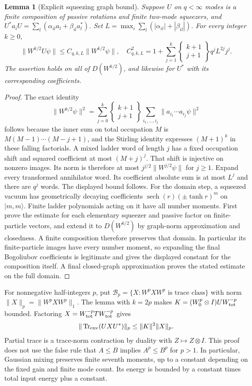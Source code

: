 \documentclass[11pt]{article}
\newcommand{\Tr}{\operatorname{Tr}}
\newtheorem{lemma}[theorem]{Lemma}
\theoremstyle{remark}\newtheorem{remark}[theorem]{Remark}
\begin{document}
\begin{lemma}[Explicit squeezing graph bound]\label{lem:graph}
Suppose $U$ on $q<\infty$ modes is a finite composition of passive
rotations and finite two-mode squeezers, and
$U^*a_iU=\sum_l(\alpha_{il}a_l+\beta_{il}a_l^*)$.
Set $L=\max_i\sum_l(|\alpha_{il}|+|\beta_{il}|)$.
For every integer $k\ge0$,
\[
 \|W^{k/2}U\psi\|\le C_{q,k,L}\|W^{k/2}\psi\|,
\quad
 C_{q,k,L}^2=1+\sum_{j=1}^k
 \left\{\begin{matrix}k+1\\j+1\end{matrix}\right\}q^j L^{2j}j^j.
\]
The assertion holds on all of $D(W^{k/2})$, and likewise for $U^*$
with its corresponding coefficients.
\end{lemma}
\begin{proof}
The exact identity
\[
 \|W^{k/2}\psi\|^2=
 \sum_{j=0}^k\left\{\begin{matrix}k+1\\j+1\end{matrix}\right\}
 \sum_{i_1,\ldots,i_j}\|a_{i_1}\cdots a_{i_j}\psi\|^2
\]
follows because the inner sum on total occupation $M$ is
$M(M-1)\cdots(M-j+1)$, and the Stirling identity expresses $(M+1)^k$
in these falling factorials. A mixed ladder word of length $j$ has a
fixed occupation shift and squared coefficient at most $(M+j)^j$.
That shift is injective on nonzero images. Its norm is therefore at most
$j^{j/2}\|W^{j/2}\psi\|$ for $j\ge1$.
Expand every transformed annihilator word. Its coefficient absolute sum
is at most $L^j$ and there are $q^j$ words. The displayed bound follows.
For the domain step, a squeezed vacuum has geometrically decaying
coefficients $\operatorname{sech}(r)(\pm\tanh r)^m$ on $|m,m\rangle$.
Finite ladder polynomials acting on it have all number moments.
First prove the estimate for each elementary squeezer and passive factor
on finite-particle vectors, and extend it to $D(W^{k/2})$ by graph-norm
approximation and closedness. A finite composition therefore preserves
that domain. In particular its finite-particle images have every number
moment, so expanding the final Bogoliubov coefficients is legitimate and
gives the displayed constant for the composition itself. A final
closed-graph approximation proves the stated estimate on the full domain.
\end{proof}

For nonnegative half-integers $p$, put $\mathcal B_p=\{X:W^pXW^p\text{ is trace class}\}$ with norm
$\|X\|_p=\|W^pXW^p\|_1$. The lemma with $k=2p$ makes
$K=(W_0^p\otimes I)UW_{\rm tot}^{-p}$ bounded.
Factoring $X=W_{\rm tot}^{-p}TW_{\rm tot}^{-p}$ gives
\begin{equation}\label{eq:weighted-channel}
 \|\Tr_{\rm env}(UXU^*)\|_p\le\|K\|^2\|X\|_p.
\end{equation}
Partial trace is a trace-norm contraction by duality with
$Z\mapsto Z\otimes I$. This proof does not use the false rule that
$A\le B$ implies $A^p\le B^p$ for $p>1$.
In particular, Gaussian mixing preserves finite seventh moments, up to
a constant depending on the fixed gain and finite mode count. Its energy
is bounded by a constant times total input energy plus a constant.
\end{document}
